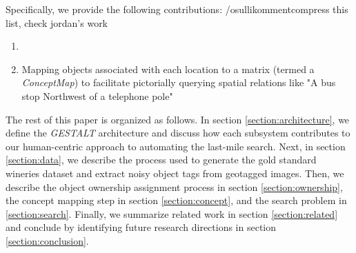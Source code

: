 


Specifically, we provide the following contributions:
/osullikomment{compress this list, check jordan's work}
\begin{enumerate}
    \item {}
    \item Mapping objects associated with each location to a matrix (termed a \emph{ConceptMap}) to facilitate pictorially querying spatial relations like "A bus stop Northwest of a telephone pole"
\end{enumerate}

The rest of this paper is organized as follows.  In section \ref{section:architecture}, we define the \emph{GESTALT} architecture and discuss how each subsystem contributes to our human-centric approach to automating the last-mile search. 
Next, in section \ref{section:data}, we describe the process used to generate the gold standard wineries dataset and extract noisy object tags from geotagged images. Then, we describe the object ownership assignment process in section \ref{section:ownership}, the concept mapping step in section \ref{section:concept}, and the search problem in \ref{section:search}. 
Finally, we summarize related work in section \ref{section:related} and conclude by identifying future research directions in section \ref{section:conclusion}.



